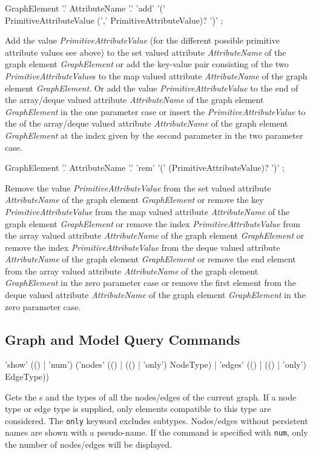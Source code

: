 \begin{rail}
  GraphElement '.' AttributeName '.' 'add' '(' \\
  	PrimitiveAttributeValue (',' PrimitiveAttributeValue)? ')' ;
\end{rail}
Add the value \emph{PrimitiveAttributeValue} (for the different possible primitive attribute values see above) to the set valued attribute \emph{AttributeName} of the graph element \emph{GraphElement} or add the key-value pair consisting of the two \emph{PrimitiveAttributeValue}s to the map valued attribute \emph{AttributeName} of the graph element \emph{GraphElement}.
Or add the value \emph{PrimitiveAttributeValue} to the end of the array/deque valued attribute \emph{AttributeName} of the graph element \emph{GraphElement} in the one parameter case or insert the \emph{PrimitiveAttributeValue} to the of the array/deque valued attribute \emph{AttributeName} of the graph element \emph{GraphElement} at the index given by the second parameter in the two parameter case.

\begin{rail}
  GraphElement '.' AttributeName '.' 'rem' '(' (PrimitiveAttributeValue)? ')' ;
\end{rail}
Remove the value \emph{PrimitiveAttributeValue} from the set valued attribute \emph{AttributeName} of the graph element \emph{GraphElement} or remove the key \emph{PrimitiveAttributeValue} from the map valued attribute \emph{AttributeName} of the graph element \emph{GraphElement} or remove the index \emph{PrimitiveAttributeValue} from the array valued attribute \emph{AttributeName} of the graph element \emph{GraphElement} or remove the index \emph{PrimitiveAttributeValue} from the deque valued attribute \emph{AttributeName} of the graph element \emph{GraphElement} or remove the end element from the array valued attribute \emph{AttributeName} of the graph element \emph{GraphElement} in the zero parameter case or remove the first element from the deque valued attribute \emph{AttributeName} of the graph element \emph{GraphElement} in the zero parameter case.

\subsection{Graph and Model Query Commands}

\begin{rail}
  'show' (() | 'num') ('nodes' (() | (() | 'only') NodeType) | 'edges' (() | (() | 'only') EdgeType))
\end{rail}
Gets the s and the types of all the nodes/edges of the current graph.
If a node type or edge type is supplied, only elements compatible to this type are considered.
The \texttt{only} keyword excludes subtypes. Nodes/edges without persistent names are shown with a pseudo-name.
If the command is specified with \texttt{num}, only the number of nodes/edges will be displayed.

